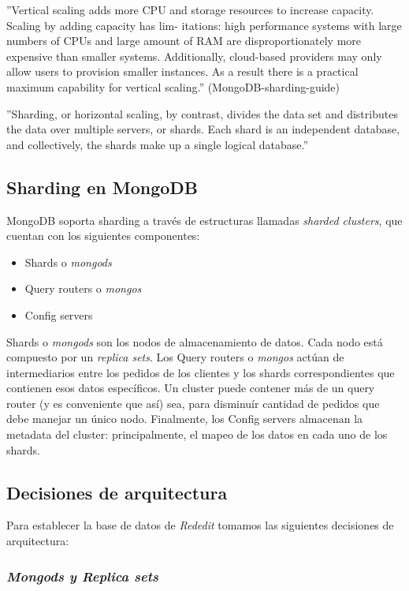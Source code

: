 ''Vertical scaling adds more CPU and storage resources to increase capacity. Scaling by adding capacity has lim-
itations: high performance systems with large numbers of CPUs and large amount of RAM are disproportionately
more expensive than smaller systems. Additionally, cloud-based providers may only allow users to provision smaller
instances. As a result there is a practical maximum capability for vertical scaling.'' (MongoDB-sharding-guide)

''Sharding, or horizontal scaling, by contrast, divides the data set and distributes the data over multiple servers, or
shards. Each shard is an independent database, and collectively, the shards make up a single logical database.''

\subsection{Sharding en MongoDB}

MongoDB soporta sharding a través de estructuras llamadas \emph{sharded clusters},
que cuentan con los siguientes componentes:

\begin{itemize}
	\item Shards o \emph{mongods}
	\item Query routers o \emph{mongos}
	\item Config servers 
\end{itemize}

Shards o \emph{mongods} son los nodos de almacenamiento de datos. Cada nodo está compuesto por un \emph{replica sets}. 
Los Query routers o \emph{mongos} actúan de intermediarios entre los pedidos de los clientes y los shards correspondientes
que contienen esos datos específicos. Un cluster puede contener más de un query router (y es conveniente que así) sea,
para disminuír cantidad de pedidos que debe manejar un único nodo.
Finalmente, los Config servers almacenan la metadata del cluster: principalmente, el mapeo de los datos en cada uno de los
shards.

\subsection{Decisiones de arquitectura}

Para establecer la base de datos de \emph{Rededit} tomamos las siguientes decisiones de arquitectura:

\subsubsection{\emph{Mongods y Replica sets}}

